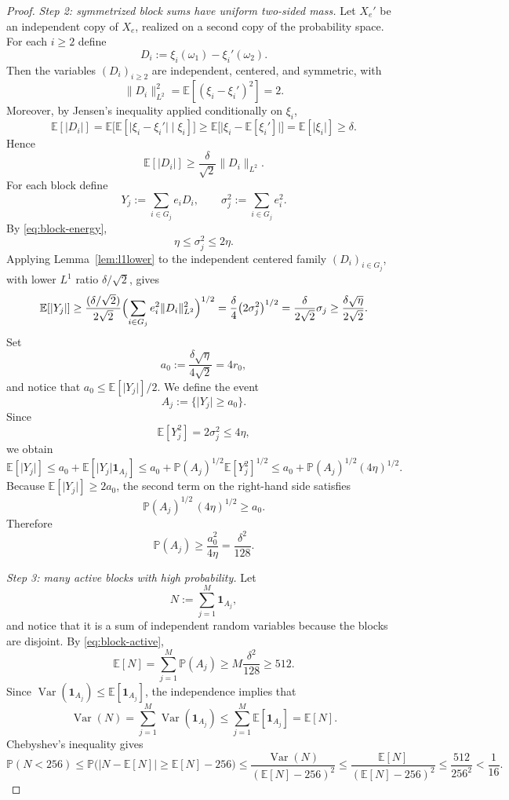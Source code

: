 \documentclass[11pt]{amsart}
\numberwithin{equation}{section}
\theoremstyle{definition}
\theoremstyle{remark}
\newcommand{\E}{\mathbb E}
\newcommand{\Prob}{\mathbb P}
\newcommand{\abs}[1]{\lvert #1 \rvert}
\newcommand{\norm}[1]{\lVert #1 \rVert}
\begin{document}
\begin{proof}
\smallskip
\noindent\emph{Step 2: symmetrized block sums have uniform two-sided mass.}
Let $X_e'$ be an independent copy of $X_e$, realized on a second copy of the
probability space.  For each $i\ge2$ define
\[
D_i:=\xi_i(\omega_1)-\xi_i'(\omega_2).
\]
Then the variables $(D_i)_{i\ge2}$ are independent, centered, and symmetric,
with
\[
\norm{D_i}_{L^2}^2
=\E[(\xi_i-\xi_i')^2]
=2.
\]
Moreover, by Jensen's inequality applied conditionally on $\xi_i$,
\[
\E[\abs{D_i}]
=\E\bigl[\E[\abs{\xi_i-\xi_i'}\mid \xi_i]\bigr]
\ge \E\bigl[\abs{\xi_i-\E[\xi_i']} \bigr]
=\E[\abs{\xi_i}]
\ge \delta.
\]
Hence
\[
\E[\abs{D_i}]
\ge \frac{\delta}{\sqrt2}\norm{D_i}_{L^2}.
\]
For each block define
\[
Y_j:=\sum_{i\in G_j} e_iD_i,
\qquad
\sigma_j^2:=\sum_{i\in G_j} e_i^2.
\]
By \eqref{eq:block-energy},
\[
\eta\le \sigma_j^2\le 2\eta.
\]
Applying Lemma~\ref{lem:l1lower} to the independent centered family
$(D_i)_{i\in G_j}$, with lower $L^1$ ratio $\delta/\sqrt2$, gives
\[
\E[\abs{Y_j}]
\ge
\frac{(\delta/\sqrt2)}{2\sqrt2}
\Bigl(\sum_{i\in G_j} e_i^2\norm{D_i}_{L^2}^2\Bigr)^{1/2}
=\frac{\delta}{4}\bigl(2\sigma_j^2\bigr)^{1/2}
=\frac{\delta}{2\sqrt{2}}\sigma_j
\ge \frac{\delta\sqrt{\eta}}{2\sqrt{2}}.
\]
Set
\[
a_0:=\frac{\delta\sqrt{\eta}}{4\sqrt{2}}=4r_0,
\]
and notice that $a_0\le \E[\abs{Y_j}]/2$.  We define the event 
\[
A_j:=\{\abs{Y_j}\ge a_0\}.
\]
Since
\[
\E[Y_j^2]=2\sigma_j^2\le 4\eta,
\]
we obtain
\[
\E[\abs{Y_j}]
\le a_0+\E[\abs{Y_j}\mathbf 1_{A_j}]
\le a_0+\Prob(A_j)^{1/2}\E[Y_j^2]^{1/2}\le a_0 +\Prob(A_j)^{1/2}(4\eta)^{1/2} .
\]
Because $\E[\abs{Y_j}]\ge 2a_0$, the second term on the right-hand side satisfies
\[
\Prob(A_j)^{1/2}\,(4\eta)^{1/2}\ge a_0.
\]
Therefore
\begin{equation}\label{eq:block-active}
\Prob(A_j)\ge \frac{a_0^2}{4\eta}=\frac{\delta^2}{128}.
\end{equation}

\noindent\emph{Step 3: many active blocks with high probability.}
Let
\[
N:=\sum_{j=1}^M \mathbf 1_{A_j},
\]
and notice that it is a sum of independent random variables because the blocks are
disjoint.  By \eqref{eq:block-active},
\[
\E[N]
=\sum_{j=1}^M \Prob(A_j)
\ge M\frac{\delta^2}{128}
\ge 512.
\]
Since $\operatorname{Var}(\mathbf 1_{A_j})\le \E[\mathbf 1_{A_j}]$, the independence implies that
\[
\operatorname{Var}(N) = \sum_{j=1}^M \operatorname{Var}(\mathbf 1_{A_j})\le \sum_{j=1}^M \E[\mathbf 1_{A_j}]=  \E[N].
\]
Chebyshev's inequality gives
\[
\Prob(N<256)
\le
\Prob\bigl(\abs{N-\E[N]}\ge \E[N]-256\bigr)
\le
\frac{\operatorname{Var}(N)}{(\E[N]-256)^2}
\le
\frac{\E[N]}{(\E[N]-256)^2}
\le \frac{512}{256^2}
<\frac1{16}.
\]


\end{proof}
\end{document}
